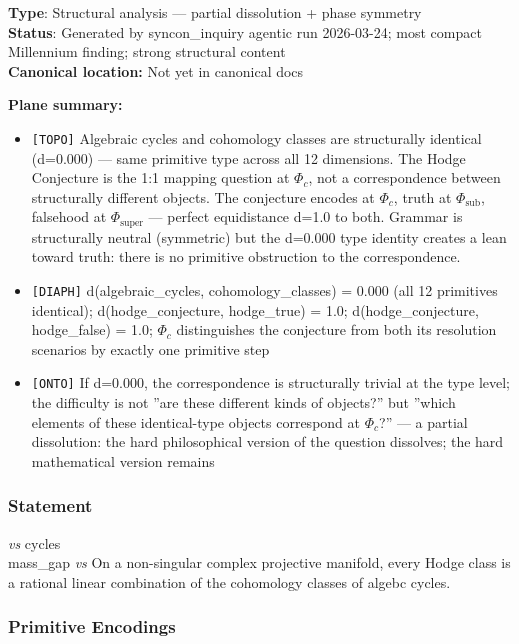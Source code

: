 \documentclass[12pt,a4paper]{article}
\begin{document}
\textbf{Type}: Structural analysis --- partial dissolution + phase symmetry   \\
\textbf{Status}: Generated by syncon\_inquiry agentic run 2026-03-24; most compact Millennium finding; strong structural content   \\
\textbf{Canonical location:} Not yet in canonical docs

\textbf{Plane summary:}

\begin{itemize}
    \item \texttt{{[}TOPO{]}} Algebraic cycles and cohomology classes are structurally identical (d=0.000) --- same primitive type across all 12 dimensions. The Hodge Conjecture is the 1:1 mapping question at $\Phi_c$, not a correspondence between structurally different objects. The conjecture encodes at $\Phi_c$, truth at $\Phi_{\text{sub}}$, falsehood at $\Phi_{\text{super}}$ --- perfect equidistance d=1.0 to both. Grammar is structurally neutral (symmetric) but the d=0.000 type identity creates a lean toward truth: there is no primitive obstruction to the correspondence.
    \item \texttt{{[}DIAPH{]}} d(algebraic\_cycles, cohomology\_classes) = 0.000 (all 12 primitives identical); d(hodge\_conjecture, hodge\_true) = 1.0; d(hodge\_conjecture, hodge\_false) = 1.0; $\Phi_c$ distinguishes the conjecture from both its resolution scenarios by exactly one primitive step
    \item \texttt{{[}ONTO{]}} If d=0.000, the correspondence is structurally trivial at the type level; the difficulty is not ''are these different kinds of objects?'' but ''which elements of these identical-type objects correspond at $\Phi_c$?'' --- a partial dissolution: the hard philosophical version of the question dissolves; the hard mathematical version remains
\end{itemize}

\subsubsection{Statement}

\emph{vs}  cycles   \\
mass\_gap \emph{vs}
On a non-singular complex projective manifold, every Hodge class is a rational linear combination of the cohomology classes of algebc cycles.

\subsubsection{Primitive Encodings}
\end{document}
